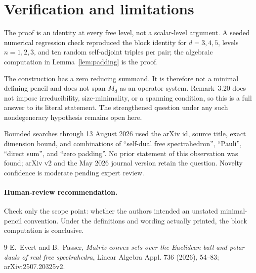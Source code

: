\documentclass[10pt]{article}
\begin{document}
\section*{Verification and limitations}

The proof is an identity at every free level, not a scalar-level argument.
A seeded numerical regression check reproduced the block identity for
$d=3,4,5$, levels $n=1,2,3$, and ten random self-adjoint triples per pair;
the algebraic computation in Lemma~\ref{lem:padding} is the proof.

The construction has a zero reducing summand.  It is therefore not a minimal
defining pencil and does not span $M_d$ as an operator system.  Remark~3.20
does not impose irreducibility, size-minimality, or a spanning condition, so
this is a full answer to its literal statement.  The strengthened question
under any such nondegeneracy hypothesis remains open here.

Bounded searches through 13 August 2026 used the arXiv id, source title, exact
dimension bound, and combinations of ``self-dual free spectrahedron'',
``Pauli'', ``direct sum'', and ``zero padding''.  No prior statement of this
observation was found; arXiv v2 and the May 2026 journal version retain the
question.  Novelty confidence is moderate pending expert review.

\paragraph{Human-review recommendation.}
Check only the scope point: whether the authors intended an unstated
minimal-pencil convention.  Under the definitions and wording actually
printed, the block computation is conclusive.

\begin{thebibliography}{9}
E.~Evert and B.~Passer,
\emph{Matrix convex sets over the Euclidean ball and polar duals of real free
spectrahedra}, Linear Algebra Appl. 736 (2026), 54--83;
arXiv:2507.20325v2.
\end{thebibliography}
\end{document}
